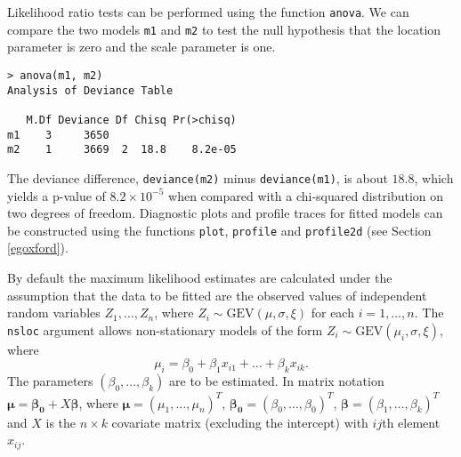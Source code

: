\documentclass[11pt,a4paper]{article}
\begin{document}
Likelihood ratio tests can be performed using the function \verb+anova+.
We can compare the two models \verb+m1+ and \verb+m2+ to test the null hypothesis that the location parameter is zero and the scale parameter is one.
\begin{verbatim}
> anova(m1, m2)
Analysis of Deviance Table

   M.Df Deviance Df Chisq Pr(>chisq)    
m1    3     3650                        
m2    1     3669  2  18.8    8.2e-05
\end{verbatim}
The deviance difference, \verb+deviance(m2)+ minus \verb+deviance(m1)+, is about $18.8$, which yields a p-value of $8.2 \times 10^{-5}$ when compared with a chi-squared distribution on two degrees of freedom. Diagnostic plots and profile traces for fitted models can be constructed using the functions \verb+plot+, \verb+profile+ and \verb+profile2d+ (see Section \ref{egoxford}).

By default the maximum likelihood estimates are calculated under the assumption that the data to be fitted are the observed values of independent random variables $Z_1,\dots,Z_n$, where $Z_i \sim \text{GEV}(\mu,\sigma,\xi)$ for each $i=1,\dots,n$. The \verb+nsloc+ argument allows non-stationary models of the form $Z_i \sim \text{GEV}(\mu_i,\sigma,\xi)$, where
\begin{equation*}
\mu_i = \beta_0 + \beta_1x_{i1} + \dots + \beta_kx_{ik}.
\end{equation*}
The parameters $(\beta_0,\dots,\beta_k)$ are to be estimated. In matrix notation $\boldsymbol{\mu} = \boldsymbol{\beta_0} + X \boldsymbol{\beta} $, where $ \boldsymbol{\mu}= (\mu_1,\dots,\mu_n)^T$, $\boldsymbol{\beta_0} = (\beta_0,\dots,\beta_0)^T$, $\boldsymbol{\beta} = (\beta_1,\dots,\beta_k)^T$ and $X$ is the $n \times k$ covariate matrix (excluding the intercept) with $ij$th element $x_{ij}$.
\end{document}

